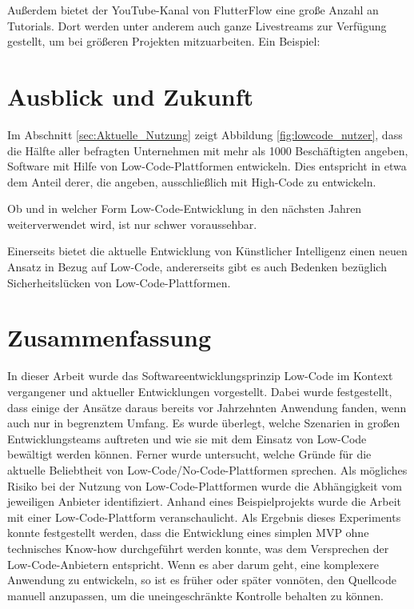 \documentclass[acmtog, language=ngerman]{acmart}
\begin{document}
Außerdem bietet der YouTube-Kanal von FlutterFlow eine große Anzahl an Tutorials. Dort werden unter anderem auch ganze Livestreams zur Verfügung gestellt, um bei größeren Projekten mitzuarbeiten. Ein Beispiel: \cite{flutterflow_youtube}


\section{Ausblick und Zukunft}

Im Abschnitt \ref{sec:Aktuelle_Nutzung} zeigt Abbildung \ref{fig:lowcode_nutzer}, dass die Hälfte aller befragten Unternehmen mit mehr als 1000 Beschäftigten angeben, Software mit Hilfe von Low-Code-Plattformen entwickeln. Dies entspricht in etwa dem Anteil derer, die angeben, ausschließlich mit High-Code zu entwickeln.  

Ob und in welcher Form Low-Code-Entwicklung in den nächsten Jahren weiterverwendet wird, ist nur schwer voraussehbar.

Einerseits bietet die aktuelle Entwicklung von Künstlicher Intelligenz einen neuen Ansatz in Bezug auf Low-Code, andererseits gibt es auch Bedenken bezüglich Sicherheitslücken von Low-Code-Plattformen. \cite{studie_low_code}

\section{Zusammenfassung}
In dieser Arbeit wurde das Softwareentwicklungsprinzip Low-Code im Kontext vergangener und aktueller Entwicklungen vorgestellt. Dabei wurde festgestellt, dass einige der Ansätze daraus bereits vor Jahrzehnten Anwendung fanden, wenn auch nur in begrenztem Umfang. Es wurde überlegt, welche Szenarien in großen Entwicklungsteams auftreten und wie sie mit dem Einsatz von Low-Code bewältigt werden können. Ferner wurde untersucht, welche Gründe für die aktuelle Beliebtheit von Low-Code/No-Code-Plattformen sprechen. Als mögliches Risiko bei der Nutzung von Low-Code-Plattformen wurde die Abhängigkeit vom jeweiligen Anbieter identifiziert. Anhand eines Beispielprojekts wurde die Arbeit mit einer Low-Code-Plattform veranschaulicht. Als Ergebnis dieses Experiments konnte festgestellt werden, dass die Entwicklung eines simplen MVP ohne technisches Know-how durchgeführt werden konnte, was dem Versprechen der Low-Code-Anbietern entspricht. Wenn es aber darum geht, eine komplexere Anwendung zu entwickeln, so ist es früher oder später vonnöten, den Quellcode manuell anzupassen, um die uneingeschränkte Kontrolle behalten zu können.
\end{document}

